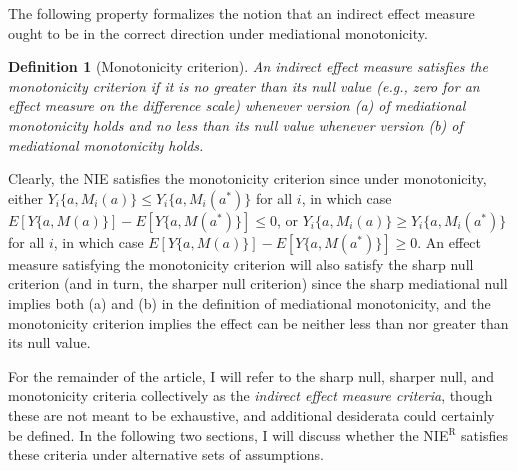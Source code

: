 \documentclass[12pt]{article}
\newtheorem{definition}{Definition}
\begin{document}
The following property formalizes the notion that an indirect effect measure ought to be in the correct direction under mediational monotonicity.
\begin{definition}[Monotonicity criterion]
    \label{def:mono-criterion}
    An indirect effect measure satisfies the \emph{monotonicity criterion} if it is no greater than its null value (e.g., zero for an effect measure on the difference scale) whenever version (a) of mediational monotonicity holds and no less than its null value whenever version (b) of mediational monotonicity holds.
\end{definition}
Clearly, the NIE satisfies the monotonicity criterion since under monotonicity, either $Y_i\{a,M_i(a)\} \leq Y_i\{a,M_i(a^*)\}$ for all $i$, in which case $E[Y\{a,M(a)\}] \allowbreak - E[Y\{a,M(a^*)\}] \allowbreak \leq \allowbreak 0$, or $Y_i\{a,M_i(a)\} \geq Y_i\{a,M_i(a^*)\}$ for all $i$, in which case $E[Y\{a,M(a)\}] - E[Y\{a,M(a^*)\}] \geq 0$. An effect measure satisfying the monotonicity criterion will also satisfy the sharp null criterion (and in turn, the sharper null criterion) since the sharp mediational null implies both (a) and (b) in the definition of mediational monotonicity, and the monotonicity criterion implies the effect can be neither less than nor greater than its null value. %

For the remainder of the article, I will refer to the sharp null, sharper null, and monotonicity criteria collectively as the \emph{indirect effect measure criteria}, though these are not meant to be exhaustive, and additional desiderata could certainly be defined. In the following two sections, I will discuss whether the NIE$^\text{R}$ satisfies these criteria %
under alternative sets of assumptions.
\end{document}
